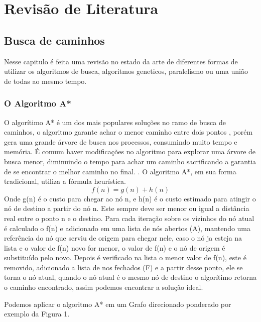 \chapter[Revisão de Literatura]{Revisão de Literatura}


\section{Busca de caminhos}

Nesse capitulo é feita uma revisão no estado da arte de diferentes formas de utilizar os algoritmos de busca, algoritmos geneticos, paralelismo ou uma união de todas ao mesmo tempo.

\subsection{O Algoritmo A*}

O algorítimo A* é um dos mais populares soluções no ramo de busca de caminhos, o algoritmo garante achar o menor caminho entre dois pontos \cite{PEHart}, porém gera uma grande árvore de busca nos processos, consumindo muito tempo e memória. É comum haver modificações no algoritmo para explorar uma árvore de busca menor, diminuindo o tempo para achar um caminho sacrificando a garantia de se encontrar o melhor caminho no final. \cite{Botea}.
O algoritmo A*, em sua forma tradicional, utiliza a fórmula heurística.
\[f(n) = g(n) + h(n)\]
Onde g(n) é o custo para chegar ao nó n, e h(n) é o custo estimado para atingir o nó de destino a partir do nó n. Este sempre deve ser menor ou igual a distância real entre o ponto n e o destino. Para cada iteração sobre os vizinhos do nó atual é calculado o f(n) e adicionado em uma lista de nós abertos (A), mantendo uma referência do nó que serviu de origem para chegar nele, caso o nó ja esteja na lista e o valor de f(n) novo for menor, o valor de f(n) e o nó de origem é substituído pelo novo. Depois é verificado na lista o menor valor de f(n), este é removido, adicionado a lista de nos fechados (F) e a partir desse ponto, ele se torna o nó atual, quando o nó atual é o mesmo nó de destino o algorítimo retorna o caminho encontrado, assim podemos encontrar a solução ideal. \cite{PEHart}

Podemos aplicar o algoritmo A* em um Grafo direcionado ponderado por exemplo da Figura 1.


